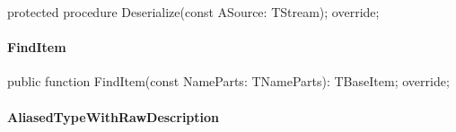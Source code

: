\documentclass{report}
\newif\ifpdf
\begin{document}
\label{PasDoc_Items.TPasAliasType-Deserialize}
\begin{list}{}{
\setlength{\itemindent}{0cm}
\setlength{\listparindent}{0cm}
\setlength{\leftmargin}{\evensidemargin}
\addtolength{\leftmargin}{\tmplength}
\settowidth{\labelsep}{X}
\addtolength{\leftmargin}{\labelsep}
\setlength{\labelwidth}{\tmplength}
}
\item[\textbf{Declaration}\hfill]
\ifpdf
\begin{flushleft}
\fi
\begin{ttfamily}
protected procedure Deserialize(const ASource: TStream); override;\end{ttfamily}

\ifpdf
\end{flushleft}
\fi

\end{list}
\paragraph*{FindItem}\hspace*{\fill}

\label{PasDoc_Items.TPasAliasType-FindItem}
\begin{list}{}{
\setlength{\itemindent}{0cm}
\setlength{\listparindent}{0cm}
\setlength{\leftmargin}{\evensidemargin}
\addtolength{\leftmargin}{\tmplength}
\settowidth{\labelsep}{X}
\addtolength{\leftmargin}{\labelsep}
\setlength{\labelwidth}{\tmplength}
}
\item[\textbf{Declaration}\hfill]
\ifpdf
\begin{flushleft}
\fi
\begin{ttfamily}
public function FindItem(const NameParts: TNameParts): TBaseItem; override;\end{ttfamily}

\ifpdf
\end{flushleft}
\fi

\end{list}
\paragraph*{AliasedTypeWithRawDescription}\hspace*{\fill}
\end{document}
